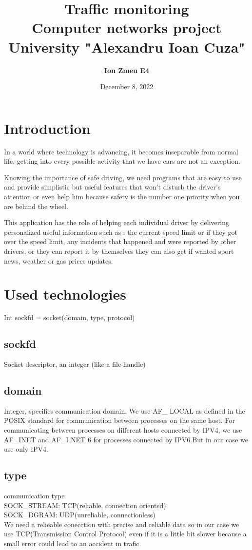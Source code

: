 \documentclass{article}
\title{\large \textbf{ Traffic monitoring\\ Computer networks project \\University "Alexandru Ioan Cuza"  }}
\author{\large \textbf{ Ion Zmeu E4}}
\date{December 8, 2022}
\begin{document}
\maketitle

\section{\textbf{Introduction}}
\hspace{1.5cm}In a world where technology is advancing, it becomes inseparable from normal life, getting into every possible activity that we have cars are not an exception.

\hspace{1cm}Knowing the importance of safe driving, we need programs that are easy to use and provide simplistic but useful features that won't disturb the driver's attention or even help him because safety is the number one priority when you are behind the wheel.

\hspace{1cm}This application has the role of helping each individual driver by delivering personalized useful information such as : the current speed limit or if they got over the speed limit, any incidents that happened and were reported by other drivers, or they can report it by themselves they can also get if wanted sport news, weather or gas prices updates.
\section{\textbf{Used technologies}}
Int sockfd = socket(domain, type, protocol)
\subsection{sockfd}
Socket descriptor, an integer (like a file-handle)\\
\subsection{domain}
Integer, specifies communication domain. We use AF\_ LOCAL as defined in the POSIX standard for communication between processes on the same host. For communicating between processes on different hosts connected by IPV4, we use AF\_INET and AF\_I NET 6 for processes connected by IPV6.But in our case we use only IPV4.\\
\subsection{type} 
communication type\\
\hspace{1.5cm}SOCK\_STREAM: TCP(reliable, connection oriented)\\
\hspace{1.5cm}SOCK\_DGRAM: UDP(unreliable, connectionless)\\
We need a relieable conecction with precise and reliable data so in our case we use TCP(Transmission Control Protocol) even if it is a little bit slower because  a small error could lead to an accident in trafic.
\end{document}
